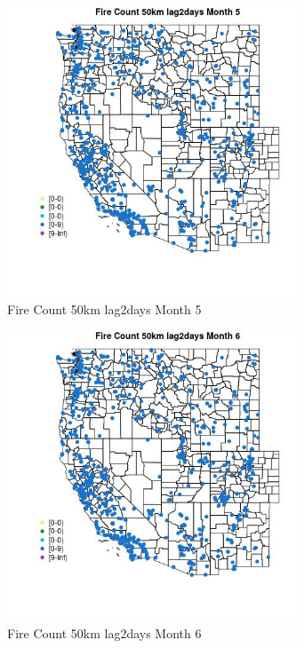 \begin{figure} 
\centering  
\includegraphics[width=0.77\textwidth]{Code_Outputs/Report_ML_input_PM25_Step4_part_e_de_duplicated_aves_compiled_2019-05-21wNAs_MapObsMo5Fire_Count_50km_lag2days.jpg} 
\caption{\label{fig:Report_ML_input_PM25_Step4_part_e_de_duplicated_aves_compiled_2019-05-21wNAsMapObsMo5Fire_Count_50km_lag2days}Fire Count 50km lag2days Month 5} 
\end{figure} 
 

\begin{figure} 
\centering  
\includegraphics[width=0.77\textwidth]{Code_Outputs/Report_ML_input_PM25_Step4_part_e_de_duplicated_aves_compiled_2019-05-21wNAs_MapObsMo6Fire_Count_50km_lag2days.jpg} 
\caption{\label{fig:Report_ML_input_PM25_Step4_part_e_de_duplicated_aves_compiled_2019-05-21wNAsMapObsMo6Fire_Count_50km_lag2days}Fire Count 50km lag2days Month 6} 
\end{figure} 
 

